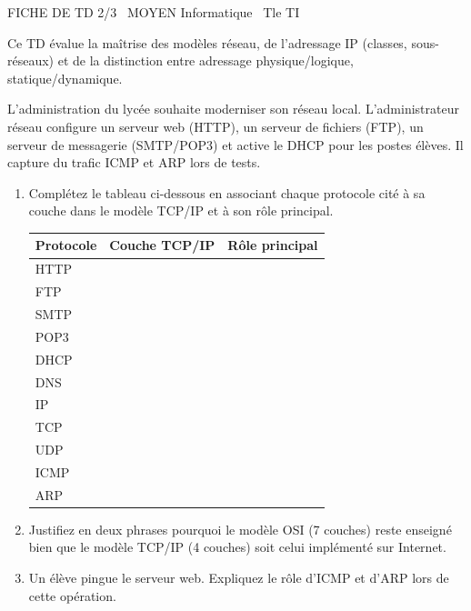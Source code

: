 \documentclass[11pt]{article}
\begin{document}
\begin{tcolorbox}[enhanced,colback=popink,colframe=popink,arc=10pt,boxrule=0pt,left=12pt,right=12pt,top=9pt,bottom=9pt]
{\color{white}\popxbold\small FICHE DE TD 2/3 \textbullet\ MOYEN \hfill Informatique \textbullet\ Tle TI\par}
\end{tcolorbox}
\vspace{4pt}
Ce TD évalue la maîtrise des modèles réseau, de l'adressage IP (classes, sous-réseaux) et de la distinction entre adressage physique/logique, statique/dynamique.

\begin{exercice}
L'administration du lycée souhaite moderniser son réseau local. L'administrateur réseau configure un serveur web (HTTP), un serveur de fichiers (FTP), un serveur de messagerie (SMTP/POP3) et active le DHCP pour les postes élèves. Il capture du trafic ICMP et ARP lors de tests.

\begin{enumerate}
    \item Complétez le tableau ci-dessous en associant chaque protocole cité à sa couche dans le modèle TCP/IP et à son rôle principal.
    \begin{tabular}{|l|c|p{7cm}|}
        \hline
        \textbf{Protocole} & \textbf{Couche TCP/IP} & \textbf{Rôle principal} \\
        \hline
        HTTP & & \\
        \hline
        FTP & & \\
        \hline
        SMTP & & \\
        \hline
        POP3 & & \\
        \hline
        DHCP & & \\
        \hline
        DNS & & \\
        \hline
        IP & & \\
        \hline
        TCP & & \\
        \hline
        UDP & & \\
        \hline
        ICMP & & \\
        \hline
        ARP & & \\
        \hline
    \end{tabular}
    \item Justifiez en deux phrases pourquoi le modèle OSI (7 couches) reste enseigné bien que le modèle TCP/IP (4 couches) soit celui implémenté sur Internet.
    \item Un élève pingue le serveur web. Expliquez le rôle d'ICMP et d'ARP lors de cette opération.
\end{enumerate}
\end{exercice}
\end{document}
